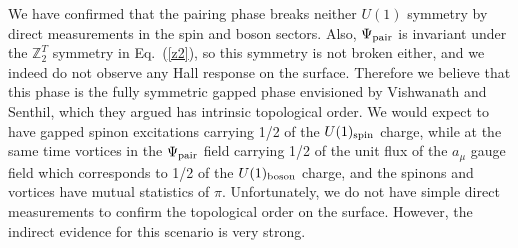 \documentclass[prb,twocolumn]{revtex4-1}
\def\ztwot{\mathbb{Z}_2^T}
\begin{document}


We have confirmed that the pairing phase breaks neither $U(1)$ symmetry by direct measurements in the spin and boson sectors.  Also,  $\Psi_{\rm pair}$ is invariant under the $\ztwot$ symmetry in Eq.~(\ref{z2}), so this symmetry is not broken either, and we indeed do not observe any Hall response on the surface.  Therefore we believe that this phase is the fully symmetric gapped phase envisioned by Vishwanath and Senthil, which they argued has intrinsic topological order.  We would expect to have gapped spinon excitations carrying 1/2 of the $U(1)_{\rm spin}$ charge, while at the same time vortices in the $\Psi_{\rm pair}$ field carrying 1/2 of the unit flux of the $a_\mu$ gauge field which corresponds to 1/2 of the $U(1)_{\rm boson}$ charge, and the spinons and vortices have mutual statistics of $\pi$.  Unfortunately, we do not have simple direct measurements to confirm the topological order on the surface.  However, the indirect evidence for this scenario is very strong.
\end{document}
